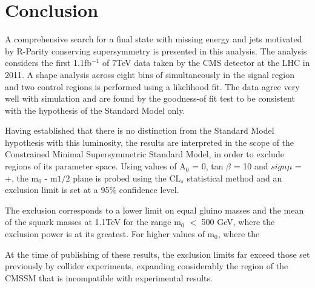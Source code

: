 \chapter{Conclusion}
\label{ch:conclusion}

A comprehensive search for a final state with missing energy and jets motivated by R-Parity conserving supersymmetry is presented in this analysis. The analysis considers the first 1.1fb$^{-1}$ of 7TeV data taken by the CMS detector at the LHC in 2011. A shape analysis across eight bins of \HT simultaneously in the signal region and two control regions is performed using a likelihood fit. The data agree very well with simulation and are found by the goodness-of fit test to be consistent with the hypothesis of the Standard Model only. 

Having established that there is no distinction from the Standard Model hypothesis with this luminosity, the results are interpreted in the scope of the Constrained Minimal Supersymmetric Standard Model, in order to exclude regions of its parameter space. Using values of A$_{0}$ = 0, tan $\beta$ = 10 and $sign{\mu}$ = +, the m$_{0}$ - m${1/2}$ plane is probed using the CL$_{s}$ statistical method and an exclusion limit is set at a 95\% confidence level. 

The exclusion corresponds to a lower limit on equal gluino masses and the mean of the squark  masses at 1.1TeV for the range m$_{0}$ $<$ 500 GeV, where the exclusion power is at its greatest. For higher values of m$_{0}$, where the 

At the time of publishing of these results, the exclusion limits far exceed those set previously by collider experiments, expanding considerably the region of the CMSSM that is incompatible with experimental results.  